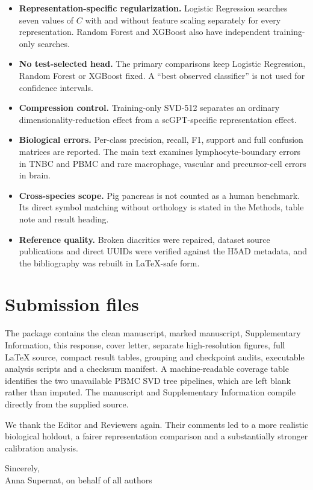 \documentclass[11pt,a4paper]{article}
\begin{document}
\begin{itemize}[leftmargin=*]
\item \textbf{Representation-specific regularization.} Logistic Regression searches seven values of $C$ with and without feature scaling separately for every representation. Random Forest and XGBoost also have independent training-only searches.
\item \textbf{No test-selected head.} The primary comparisons keep Logistic Regression, Random Forest or XGBoost fixed. A ``best observed classifier'' is not used for confidence intervals.
\item \textbf{Compression control.} Training-only SVD-512 separates an ordinary dimensionality-reduction effect from a scGPT-specific representation effect.
\item \textbf{Biological errors.} Per-class precision, recall, F1, support and full confusion matrices are reported. The main text examines lymphocyte-boundary errors in TNBC and PBMC and rare macrophage, vascular and precursor-cell errors in brain.
\item \textbf{Cross-species scope.} Pig pancreas is not counted as a human benchmark. Its direct symbol matching without orthology is stated in the Methods, table note and result heading.
\item \textbf{Reference quality.} Broken diacritics were repaired, dataset source publications and direct UUIDs were verified against the H5AD metadata, and the bibliography was rebuilt in LaTeX-safe form.
\end{itemize}

\section*{Submission files}

The package contains the clean manuscript, marked manuscript, Supplementary Information, this response, cover letter, separate high-resolution figures, full LaTeX source, compact result tables, grouping and checkpoint audits, executable analysis scripts and a checksum manifest. A machine-readable coverage table identifies the two unavailable PBMC SVD tree pipelines, which are left blank rather than imputed. The manuscript and Supplementary Information compile directly from the supplied source.

We thank the Editor and Reviewers again. Their comments led to a more realistic biological holdout, a fairer representation comparison and a substantially stronger calibration analysis.

Sincerely,\\
Anna Supernat, on behalf of all authors
\end{document}
